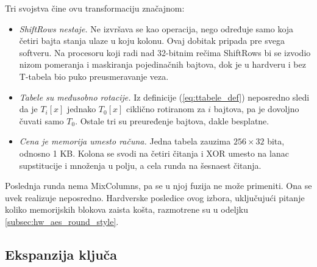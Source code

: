 Tri svojstva čine ovu transformaciju značajnom:
\begin{itemize}[itemsep=2pt]
    \item \textit{ShiftRows nestaje.} Ne izvršava se kao operacija, nego određuje samo koja četiri bajta stanja ulaze u koju kolonu. Ovaj dobitak pripada pre svega softveru. Na procesoru koji radi nad 32-bitnim rečima ShiftRows bi se izvodio nizom pomeranja i maskiranja pojedinačnih bajtova, dok je u hardveru i bez T-tabela bio puko preusmeravanje veza.
    \item \textit{Tabele su međusobno rotacije.} Iz definicije (\ref{eq:ttabele_def}) neposredno sledi da je $T_i[x]$ jednako $T_0[x]$ ciklično rotiranom za $i$ bajtova, pa je dovoljno čuvati samo $T_0$. Ostale tri su preuređenje bajtova, dakle besplatne.
    \item \textit{Cena je memorija umesto računa.} Jedna tabela zauzima $256 \times 32$ bita, odnosno 1 KB. Kolona se svodi na četiri čitanja i XOR umesto na lanac supstitucije i množenja u polju, a cela runda na šesnaest čitanja.
\end{itemize}
Poslednja runda nema MixColumns, pa se u njoj fuzija ne može primeniti. Ona se uvek realizuje neposredno. Hardverske posledice ovog izbora, uključujući pitanje koliko memorijskih blokova zaista košta, razmotrene su u odeljku \ref{subsec:hw_aes_round_style}.

\subsection{Ekspanzija ključa}
\label{subsec:aes_ekspanzija}

